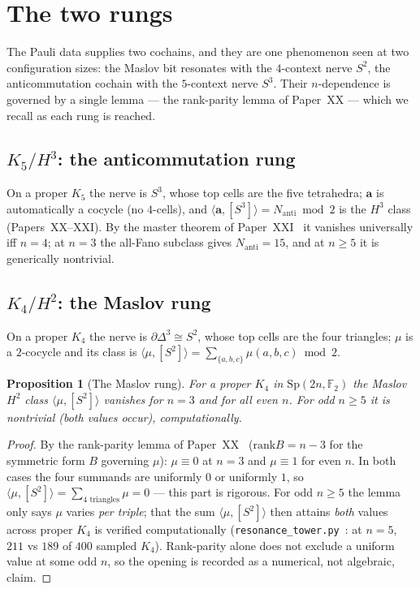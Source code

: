 \documentclass[11pt,a4paper]{article}
\newcommand{\Nanti}{N_{\mathrm{anti}}}
\newcommand{\Sp}{\mathrm{Sp}}
\newcommand{\rank}{\mathrm{rank}}
\newcommand{\F}{\mathbb{F}}
\theoremstyle{plain}
\newtheorem{proposition}[theorem]{Proposition}
\theoremstyle{definition}
\theoremstyle{remark}
\begin{document}
\section{The two rungs}\label{sec:rungs}

The Pauli data supplies two cochains, and they are one phenomenon seen at two
configuration sizes: the Maslov bit resonates with the $4$-context nerve $S^2$, the
anticommutation cochain with the $5$-context nerve $S^3$.  Their $n$-dependence is
governed by a single lemma --- the rank-parity lemma of Paper~XX --- which we
recall as each rung is reached.

\subsection{\texorpdfstring{$K_5/H^3$: the anticommutation rung}{K5/H3: the anticommutation rung}}

On a proper $K_5$ the nerve is $S^3$, whose top cells are the five tetrahedra;
$\mathbf a$ is automatically a cocycle (no $4$-cells), and
$\langle\mathbf a,[S^3]\rangle=\Nanti\bmod2$ is the $H^3$ class
(Papers~XX--XXI).  By the master theorem of Paper~XXI~\cite{PaperXXI} it vanishes
universally iff $n=4$; at $n=3$ the all-Fano subclass gives $\Nanti=15$, and at
$n\ge5$ it is generically nontrivial.

\subsection{\texorpdfstring{$K_4/H^2$: the Maslov rung}{K4/H2: the Maslov rung}}

On a proper $K_4$ the nerve is $\partial\Delta^3\cong S^2$, whose top cells are the
four triangles; $\mu$ is a $2$-cocycle and its class is
$\langle\mu,[S^2]\rangle=\sum_{\{a,b,c\}}\mu(a,b,c)\bmod2$.

\begin{proposition}[The Maslov rung]\label{prop:k4}
For a proper $K_4$ in $\Sp(2n,\F_2)$ the Maslov $H^2$ class
$\langle\mu,[S^2]\rangle$ \emph{vanishes} for $n=3$ and for all even $n$.  For odd
$n\ge5$ it is nontrivial (both values occur), computationally.
\end{proposition}

\begin{proof}
By the rank-parity lemma of Paper~XX~\cite{PaperXX} ($\rank B=n-3$ for the symmetric
form $B$ governing $\mu$): $\mu\equiv0$ at $n=3$ and $\mu\equiv1$ for even $n$.  In
both cases the four summands are uniformly $0$ or uniformly $1$, so
$\langle\mu,[S^2]\rangle=\sum_{\text{4 triangles}}\mu=0$ --- this part is rigorous.
For odd $n\ge5$ the lemma only says $\mu$ varies \emph{per triple}; that the sum
$\langle\mu,[S^2]\rangle$ then attains \emph{both} values across proper $K_4$ is
verified computationally (\texttt{resonance\_tower.py}~\cite{PaperXXIIsuppl}: at
$n=5$, $211$ vs $189$ of $400$ sampled $K_4$).  Rank-parity alone does not exclude
a uniform value at some odd $n$, so the opening is recorded as a numerical, not
algebraic, claim.
\end{proof}
\end{document}
